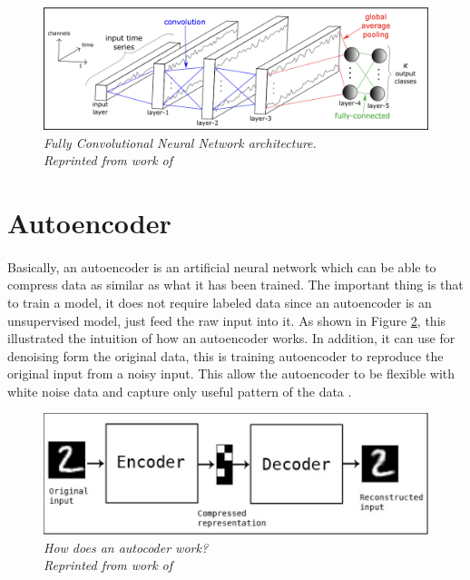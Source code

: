 \begin{figure}[H]
  \centering
  \caption[Fully Convolutional Neural Network architecture.]{\emph{Fully Convolutional Neural Network architecture.  \\
  Reprinted from work of \citeauthor{ismail_fawaz_forestier_weber_idoumghar_muller_2019} \citeyear{ismail_fawaz_forestier_weber_idoumghar_muller_2019}}}\label{fig:CNN_ts}
  \includegraphics[scale = 0.3]{figures/CNN_ts.jpg}  
\end{figure}



\section{Autoencoder}
\paragraph{}
Basically, an autoencoder is an artificial neural network which can be able to compress data as similar as what it has been trained. The important thing is that to train a model, it does not require labeled data since an autoencoder is an unsupervised model, just feed the raw input into it. As shown in Figure \ref{fig:ae}, this illustrated the intuition of how an autoencoder works. In addition, it can use for denoising form the original data, this is training autoencoder to reproduce the original input from a noisy input. This allow the autoencoder to be flexible with white noise data and capture only useful pattern of the data \cite{vincent10a}.

\begin{figure}[H]
  \centering
  \caption[How does an autocoder work?]{\emph{How does an autocoder work? \\
  Reprinted from work of \citeauthor{chollet_2016} \citeyear{chollet_2016}}}\label{fig:ae}
  \includegraphics[scale = 0.5]{figures/ae.jpg}  
\end{figure}

